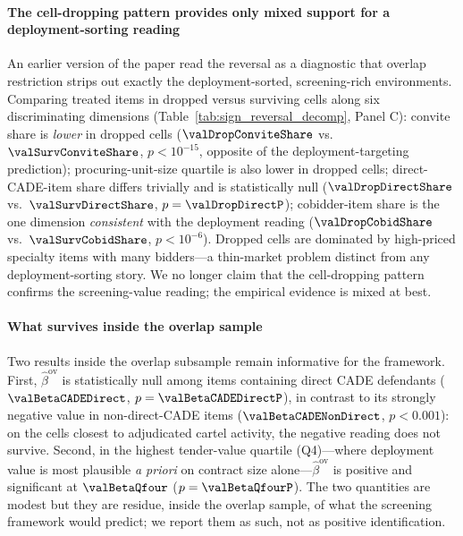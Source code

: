 \paragraph{The cell-dropping pattern provides only mixed support
for a deployment-sorting reading} An earlier version of the paper
read the reversal as a diagnostic that overlap restriction strips
out exactly the deployment-sorted, screening-rich environments.
Comparing treated items in dropped versus surviving cells along
six discriminating dimensions
(Table~\ref{tab:sign_reversal_decomp}, Panel C): convite share is
\emph{lower} in dropped cells ($\valDropConviteShare$ vs.\
$\valSurvConviteShare$, $p<10^{-15}$, opposite of the
deployment-targeting prediction); procuring-unit-size quartile
is also lower in dropped cells; direct-CADE-item share differs
trivially and is statistically null
($\valDropDirectShare$ vs.\ $\valSurvDirectShare$,
$p=\valDropDirectP$); cobidder-item share is the one dimension
\emph{consistent} with the deployment reading
($\valDropCobidShare$ vs.\ $\valSurvCobidShare$, $p<10^{-6}$).
Dropped cells are dominated by high-priced specialty items with
many bidders---a thin-market problem distinct from any
deployment-sorting story. We no longer claim that the cell-dropping
pattern confirms the screening-value reading; the empirical
evidence is mixed at best.



\paragraph{What survives inside the overlap sample} Two results
inside the overlap subsample remain informative for the framework.
First, $\widehat\beta^{\text{ov}}$ is statistically null among
items containing direct CADE defendants
($\valBetaCADEDirect$, $p=\valBetaCADEDirectP$), in contrast to
its strongly negative value in non-direct-CADE items
($\valBetaCADENonDirect$, $p<0.001$): on the cells closest to
adjudicated cartel activity, the negative reading does not
survive. Second, in the highest tender-value quartile (Q4)---where
deployment value is most plausible \emph{a priori} on contract
size alone---$\widehat\beta^{\text{ov}}$ is positive and
significant at $\valBetaQfour$ ($p=\valBetaQfourP$). The two
quantities are modest but they are residue, inside the overlap
sample, of what the screening framework would predict; we report
them as such, not as positive identification.

